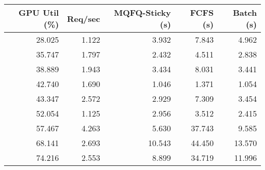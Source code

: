 \begin{tabular}{rrrrr}
GPU Util (\%) & Req/sec & MQFQ-Sticky (s) & FCFS (s) & Batch (s)\\
\hline
28.025 & 1.122 & 3.932 & 7.843 & 4.962\\
35.747 & 1.797 & 2.432 & 4.511 & 2.838\\
38.889 & 1.943 & 3.434 & 8.031 & 3.441\\
42.740 & 1.690 & 1.046 & 1.371 & 1.054\\
43.347 & 2.572 & 2.929 & 7.309 & 3.454\\
52.054 & 1.125 & 2.956 & 3.512 & 2.415\\
57.467 & 4.263 & 5.630 & 37.743 & 9.585\\
68.141 & 2.693 & 10.543 & 44.450 & 13.570\\
74.216 & 2.553 & 8.899 & 34.719 & 11.996\\
\end{tabular}
